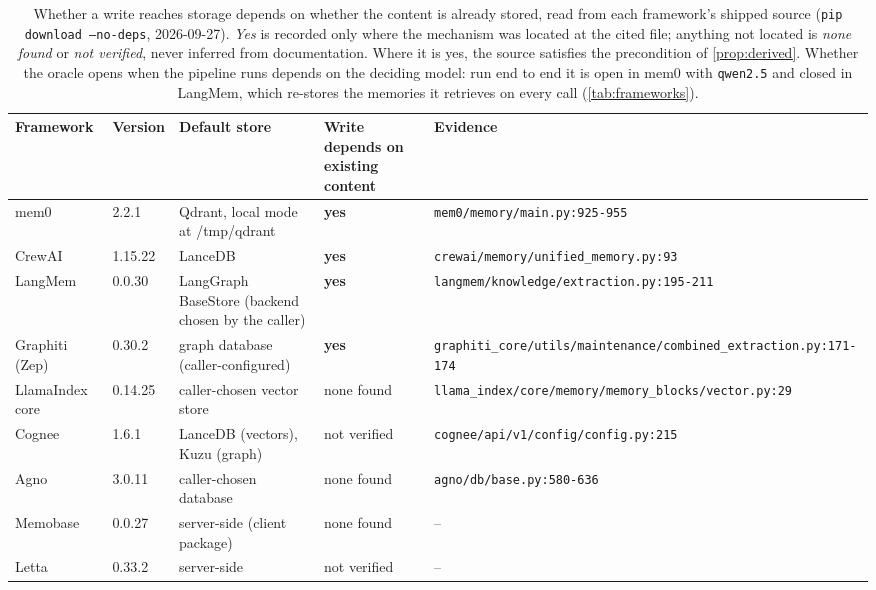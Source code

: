 \begin{table}[t]
\centering
\caption{Whether a write reaches storage depends on whether the content is already stored, read from each framework's shipped source (\texttt{pip download --no-deps}, 2026-09-27). \emph{Yes} is recorded only where the mechanism was located at the cited file; anything not located is \emph{none found} or \emph{not verified}, never inferred from documentation. Where it is yes, the source satisfies the precondition of \cref{prop:derived}. Whether the oracle opens when the pipeline runs depends on the deciding model: run end to end it is open in mem0 with \texttt{qwen2.5} and closed in LangMem, which re-stores the memories it retrieves on every call (\cref{tab:frameworks}).}
\label{tab:supp-census}
\small
\setlength{\tabcolsep}{4pt}
\begin{tabular}{llp{3.6cm}lp{4.9cm}}
\toprule
Framework & Version & Default store & Write depends on existing content & Evidence \\
\midrule
mem0 & 2.2.1 & Qdrant, local mode at /tmp/qdrant & \textbf{yes} & \nolinkurl{mem0/memory/main.py:925-955} \\
CrewAI & 1.15.22 & LanceDB & \textbf{yes} & \nolinkurl{crewai/memory/unified_memory.py:93} \\
LangMem & 0.0.30 & LangGraph BaseStore (backend chosen by the caller) & \textbf{yes} & \nolinkurl{langmem/knowledge/extraction.py:195-211} \\
Graphiti (Zep) & 0.30.2 & graph database (caller-configured) & \textbf{yes} & \nolinkurl{graphiti_core/utils/maintenance/combined_extraction.py:171-174} \\
LlamaIndex core & 0.14.25 & caller-chosen vector store & none found & \nolinkurl{llama_index/core/memory/memory_blocks/vector.py:29} \\
Cognee & 1.6.1 & LanceDB (vectors), Kuzu (graph) & not verified & \nolinkurl{cognee/api/v1/config/config.py:215} \\
Agno & 3.0.11 & caller-chosen database & none found & \nolinkurl{agno/db/base.py:580-636} \\
Memobase & 0.0.27 & server-side (client package) & none found & -- \\
Letta & 0.33.2 & server-side & not verified & -- \\
\bottomrule
\end{tabular}
\end{table}
